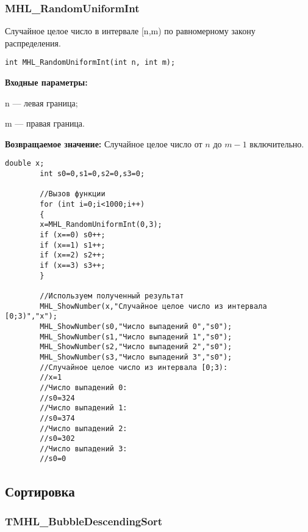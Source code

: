 \documentclass[a4paper,12pt]{article}
\begin{document}
\subsubsection{MHL\_RandomUniformInt}\label{MHL_RandomUniformInt}

Случайное целое число в интервале [n,m) по равномерному закону распределения.


\begin{lstlisting}[label=code_syntax_MHL_RandomUniformInt,caption=Синтаксис]
int MHL_RandomUniformInt(int n, int m);
\end{lstlisting}

\textbf{Входные параметры:}

n --- левая граница;

 m --- правая граница.

\textbf{Возвращаемое значение:}
Случайное целое число от $n$ до $m-1$ включительно.


\begin{lstlisting}[label=code_use_MHL_RandomUniformInt,caption=Пример использования]
        double x;
        int s0=0,s1=0,s2=0,s3=0;

        //Вызов функции
        for (int i=0;i<1000;i++)
        {
        x=MHL_RandomUniformInt(0,3);
        if (x==0) s0++;
        if (x==1) s1++;
        if (x==2) s2++;
        if (x==3) s3++;
        }

        //Используем полученный результат
        MHL_ShowNumber(x,"Случайное целое число из интервала [0;3)","x");
        MHL_ShowNumber(s0,"Число выпадений 0","s0");
        MHL_ShowNumber(s1,"Число выпадений 1","s0");
        MHL_ShowNumber(s2,"Число выпадений 2","s0");
        MHL_ShowNumber(s3,"Число выпадений 3","s0");
        //Случайное целое число из интервала [0;3):
        //x=1
        //Число выпадений 0:
        //s0=324
        //Число выпадений 1:
        //s0=374
        //Число выпадений 2:
        //s0=302
        //Число выпадений 3:
        //s0=0
\end{lstlisting}

\subsection{Сортировка}

\subsubsection{TMHL\_BubbleDescendingSort}\label{TMHL_BubbleDescendingSort}
\end{document}
